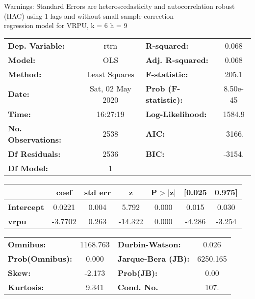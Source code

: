 Warnings: \newline
 [1] Standard Errors are heteroscedasticity and autocorrelation robust (HAC) using 1 lags and without small sample correction\\ 

regression model for VRPU, k = 6 h = 9\begin{center}
\begin{tabular}{lclc}
\toprule
\textbf{Dep. Variable:}    &       rtrn       & \textbf{  R-squared:         } &     0.068   \\
\textbf{Model:}            &       OLS        & \textbf{  Adj. R-squared:    } &     0.068   \\
\textbf{Method:}           &  Least Squares   & \textbf{  F-statistic:       } &     205.1   \\
\textbf{Date:}             & Sat, 02 May 2020 & \textbf{  Prob (F-statistic):} &  8.50e-45   \\
\textbf{Time:}             &     16:27:19     & \textbf{  Log-Likelihood:    } &    1584.9   \\
\textbf{No. Observations:} &        2538      & \textbf{  AIC:               } &    -3166.   \\
\textbf{Df Residuals:}     &        2536      & \textbf{  BIC:               } &    -3154.   \\
\textbf{Df Model:}         &           1      & \textbf{                     } &             \\
\bottomrule
\end{tabular}
\begin{tabular}{lcccccc}
                   & \textbf{coef} & \textbf{std err} & \textbf{z} & \textbf{P$> |$z$|$} & \textbf{[0.025} & \textbf{0.975]}  \\
\midrule
\textbf{Intercept} &       0.0221  &        0.004     &     5.792  &         0.000        &        0.015    &        0.030     \\
\textbf{vrpu}      &      -3.7702  &        0.263     &   -14.322  &         0.000        &       -4.286    &       -3.254     \\
\bottomrule
\end{tabular}
\begin{tabular}{lclc}
\textbf{Omnibus:}       & 1168.763 & \textbf{  Durbin-Watson:     } &    0.026  \\
\textbf{Prob(Omnibus):} &   0.000  & \textbf{  Jarque-Bera (JB):  } & 6250.165  \\
\textbf{Skew:}          &  -2.173  & \textbf{  Prob(JB):          } &     0.00  \\
\textbf{Kurtosis:}      &   9.341  & \textbf{  Cond. No.          } &     107.  \\
\bottomrule
\end{tabular}
\end{center}

